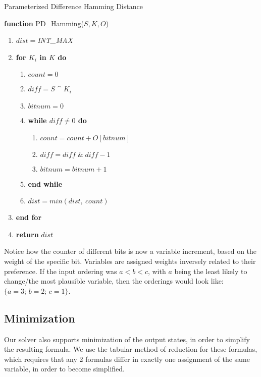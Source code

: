 \documentclass[english]{article}
\begin{document}
\begin{algorithm}[H]

\caption{Parameterized Difference Hamming Distance}

\textbf{function }PD\_Hamming($S,K,O$)
\begin{enumerate}
\item $dist=$\emph{INT\_MAX}
\item \textbf{for $K_{i}$ in $K$ do}
\begin{enumerate}
\item $count=0$
\item $diff=S$ \textasciicircum{} $K_{i}$
\item $bitnum=0$
\item \textbf{while $diff\neq0$ do}
\begin{enumerate}
\item $count=count+O[bitnum]$
\item $diff=diff\;\&\;diff-1$
\item $bitnum=bitnum+1$
\end{enumerate}
\item \textbf{end while}
\item $dist=min(dist,\:count)$
\end{enumerate}
\item \textbf{end for}
\item \textbf{return }$dist$
\end{enumerate}
\end{algorithm}

\noindent Notice how the counter of different bits is now a variable
increment, based on the weight of the specific bit. Variables are
assigned weights inversely related to their preference. If the input
ordering was $a<b<c$, with $a$ being the least likely to change/the
most plausible variable, then the orderings would look like: $\{a=3;\,b=2;\,c=1\}$. 

\subsection{Minimization}

Our solver also supports minimization of the output states, in order
to simplify the resulting formula. We use the tabular method of reduction
for these formulas, which requires that any 2 formulas differ in exactly
one assignment of the same variable, in order to become simplified.
\end{document}
